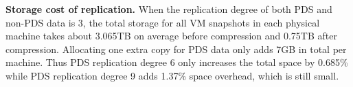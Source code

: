 
{\bf Storage cost of replication.} 
When the replication degree of both PDS and non-PDS data is 3, 
the total storage  for all VM snapshots in each physical machine takes about 3.065TB on average before compression
and 0.75TB after compression.  Allocating  one extra  copy for PDS data only adds  7GB in total per machine.
Thus PDS replication degree 6 only increases the total space by 0.685\% while PDS replication degree 9 adds 1.37\% 
space overhead, which is still small.

